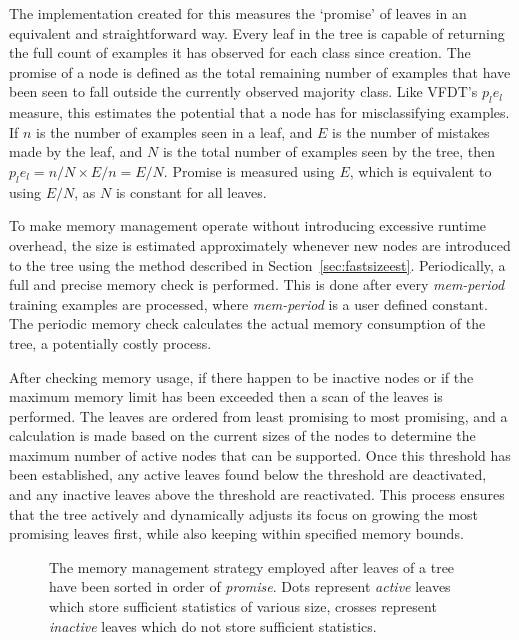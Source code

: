 The implementation created for this \thesis  measures the `promise' of leaves in an equivalent and straightforward way. Every leaf in the tree is capable of returning the full count of examples it has observed for each class since creation. The promise of a node is defined as the total remaining number of examples that have been seen to fall outside the currently observed majority class. Like VFDT's $p_{l}e_{l}$ measure, this estimates the potential that a node has for misclassifying examples. If $n$ is the number of examples seen in a leaf, and $E$ is the number of mistakes made by the leaf, and $N$ is the total number of examples seen by the tree, then $p_{l}e_{l} = n/N \times E/n = E/N$. Promise is measured using $E$, which is equivalent to using $E/N$, as $N$ is constant for all leaves.

To make memory management operate without introducing excessive runtime overhead, the size is estimated approximately whenever new nodes are introduced to the tree using the method described in Section~\ref{sec:fastsizeest}. Periodically, a full and precise memory check is performed. This is done after every {\em mem-period} training examples are processed, where {\em mem-period} is a user defined constant. The periodic memory check calculates the actual memory consumption of the tree, a potentially costly process.

After checking memory usage, if there happen to be inactive nodes or if the maximum memory limit has been exceeded then a scan of the leaves is performed. The leaves are ordered from least promising to most promising, and a calculation is made based on the current sizes of the nodes to determine the maximum number of active nodes that can be supported. Once this threshold has been established, any active leaves found below the threshold are deactivated, and any inactive leaves above the threshold are reactivated. This process ensures that the tree actively and dynamically adjusts its focus on growing the most promising leaves first, while also keeping within specified memory bounds.

\begin{figure}
\centering
{}
\caption{The memory management strategy employed after leaves of a tree have been sorted in order of {\em promise}. Dots represent {\em active} leaves which store sufficient statistics of various size, crosses represent {\em inactive} leaves which do not store sufficient statistics.}
\label{fig:memmanage}
\end{figure}

